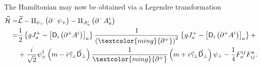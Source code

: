 The Hamiltonian may now be obtained via a Legendre transformation
\begin{equation}\label{lc33}
\begin{aligned}
\widetilde{\mathcal{H}}=&\widetilde{\mathcal{L}}-\Pi_{\psi_+}\left(\partial^-\psi_+\right)-\Pi_{A_a^i}\left(\partial^-A_a^i\right)\\
=&\frac{1}{2}\left\lbrace gJ_a^+-\left[\textsf{D}_i\left(\partial^+A^i\right)\right]_a\right\rbrace\frac{1}{\left(\textcolor{ming}{\partial^+}\right)^2}\left\lbrace gJ_a^+-\left[\textsf{D}_i\left(\partial^+A^i\right)\right]_a\right\rbrace+\\
&+\frac{i}{\sqrt{2}}\psi_+^\dag\left(m-i\vec{\gamma}_\perp\vec{\textsf{D}}_\perp\right)\frac{1}{\textcolor{ming}{\partial^+}}\left(m+i\vec{\gamma}_\perp\vec{\textsf{D}}_\perp\right)\psi_+-\frac{1}{4}F^{ij}_aF_{ij}^a.
\end{aligned}
\end{equation}


